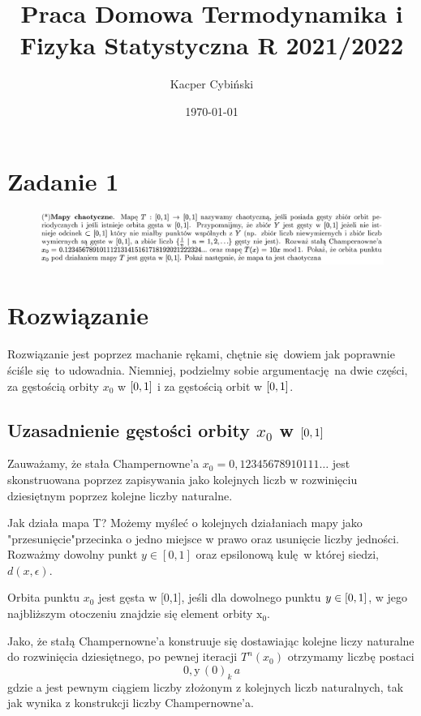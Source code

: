 \documentclass[12pt,a4paper]{article}
\title{Praca Domowa Termodynamika i Fizyka Statystyczna R 2021/2022}
\author{Kacper Cybiński}
\date{\today}
\begin{document}
\maketitle

\section{Zadanie 1}

\begin{figure}[h!]
    \includegraphics[width=\linewidth]{Zrzut ekranu 2022-05-19 o 08.10.03.png}
\end{figure}

\FloatBarrier

\section{Rozwiązanie}

Rozwiązanie jest poprzez machanie rękami, chętnie się dowiem jak poprawnie ściśle się to udowadnia. Niemniej, podzielmy sobie argumentację na dwie części, za gęstością orbity $x_0$ w $\qty[0,1]$ i za gęstością orbit w $\qty[0,1]$.

\subsection{Uzasadnienie gęstości orbity $x_0$ w $\qty[0,1]$}


Zauważamy, że stała Champernowne'a $x_{0}=0,12345678910111 \ldots$ jest skonstruowana poprzez zapisywania jako kolejnych liczb w rozwinięciu dziesiętnym poprzez kolejne liczby naturalne. 

Jak działa mapa T? Możemy myśleć o kolejnych działaniach mapy jako "przesunięcie"przecinka o jedno miejsce w prawo oraz usunięcie liczby jedności. Rozważmy dowolny punkt $y \in[0,1]$ oraz epsilonową kulę w której siedzi, $d(x, \epsilon)$. 

Orbita punktu $x_{0}$ jest gęsta w [0,1], jeśli dla dowolnego punktu $y\in\qty[0,1]$, w jego najbliższym otoczeniu znajdzie się element orbity $\mathrm{x}_{0}$. 

Jako, że stałą Champernowne'a konstruuje się dostawiając kolejne liczy naturalne do rozwinięcia dziesiętnego, po pewnej iteracji $T^{n}\left(x_{0}\right)$ otrzymamy liczbę postaci 
$$0, \mathrm{y} \, (0)_{k} \, a$$
gdzie a jest pewnym ciągiem liczby złożonym z kolejnych liczb naturalnych, tak jak wynika z konstrukcji liczby Champernowne'a. 
\end{document}
